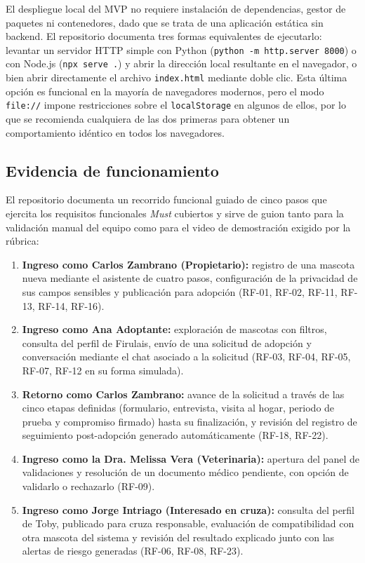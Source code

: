 \documentclass[journal,onecolumn]{IEEEtran}
\begin{document}
	El despliegue local del MVP no requiere instalación de dependencias, gestor
	de paquetes ni contenedores, dado que se trata de una aplicación estática
	sin backend. El repositorio documenta tres formas equivalentes de
	ejecutarlo: levantar un servidor HTTP simple con Python
	(\texttt{python -m http.server 8000}) o con Node.js (\texttt{npx serve .})
	y abrir la dirección local resultante en el navegador, o bien abrir
	directamente el archivo \texttt{index.html} mediante doble clic. Esta
	última opción es funcional en la mayoría de navegadores modernos, pero el
	modo \texttt{file://} impone restricciones sobre el \texttt{localStorage} en
	algunos de ellos, por lo que se recomienda cualquiera de las dos primeras
	para obtener un comportamiento idéntico en todos los navegadores.
	
	\subsection{Evidencia de funcionamiento}
	\label{sec:mvp-evidencia}
	
	El repositorio documenta un recorrido funcional guiado de cinco pasos que
	ejercita los requisitos funcionales \emph{Must} cubiertos y sirve de guion
	tanto para la validación manual del equipo como para el video de
	demostración exigido por la rúbrica:
	
	\begin{enumerate}[leftmargin=*]
		\item \textbf{Ingreso como Carlos Zambrano (Propietario):} registro de
		una mascota nueva mediante el asistente de cuatro pasos, configuración
		de la privacidad de sus campos sensibles y publicación para adopción
		(RF-01, RF-02, RF-11, RF-13, RF-14, RF-16).
		\item \textbf{Ingreso como Ana Adoptante:} exploración de mascotas con
		filtros, consulta del perfil de Firulais, envío de una solicitud de
		adopción y conversación mediante el chat asociado a la solicitud
		(RF-03, RF-04, RF-05, RF-07, RF-12 en su forma simulada).
		\item \textbf{Retorno como Carlos Zambrano:} avance de la solicitud a
		través de las cinco etapas definidas (formulario, entrevista, visita al
		hogar, periodo de prueba y compromiso firmado) hasta su finalización, y
		revisión del registro de seguimiento post-adopción generado
		automáticamente (RF-18, RF-22).
		\item \textbf{Ingreso como la Dra. Melissa Vera (Veterinaria):}
		apertura del panel de validaciones y resolución de un documento médico
		pendiente, con opción de validarlo o rechazarlo (RF-09).
		\item \textbf{Ingreso como Jorge Intriago (Interesado en cruza):}
		consulta del perfil de Toby, publicado para cruza responsable,
		evaluación de compatibilidad con otra mascota del sistema y revisión
		del resultado explicado junto con las alertas de riesgo generadas
		(RF-06, RF-08, RF-23).
	\end{enumerate}
	
\end{document}
